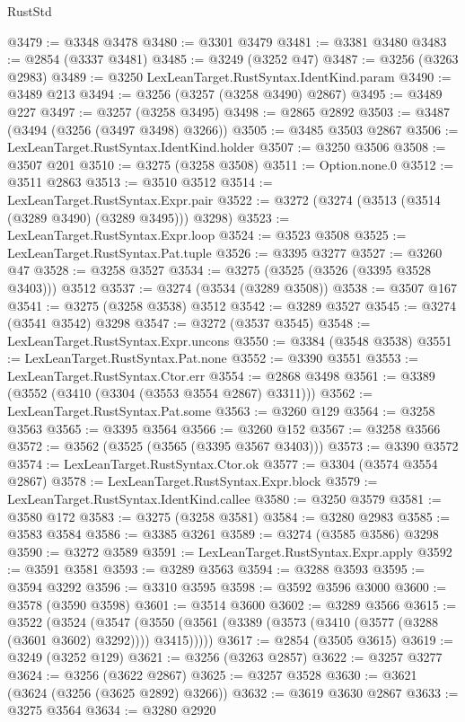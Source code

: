\begin{lexlean}{RustStd}
\begin{coremodule}
@3479 := @3348 @3478
@3480 := @3301 @3479
@3481 := @3381 @3480
@3483 := @2854 (@3337 @3481)
@3485 := @3249 (@3252 @47)
@3487 := @3256 (@3263 @2983)
@3489 := @3250 LexLeanTarget.RustSyntax.IdentKind.param
@3490 := @3489 @213
@3494 := @3256 (@3257 (@3258 @3490) @2867)
@3495 := @3489 @227
@3497 := @3257 (@3258 @3495)
@3498 := @2865 @2892
@3503 := @3487 (@3494 (@3256 (@3497 @3498) @3266))
@3505 := @3485 @3503 @2867
@3506 := LexLeanTarget.RustSyntax.IdentKind.holder
@3507 := @3250 @3506
@3508 := @3507 @201
@3510 := @3275 (@3258 @3508)
@3511 := Option.none.{0}
@3512 := @3511 @2863
@3513 := @3510 @3512
@3514 := LexLeanTarget.RustSyntax.Expr.pair
@3522 := @3272 (@3274 (@3513 (@3514 (@3289 @3490) (@3289 @3495))) @3298)
@3523 := LexLeanTarget.RustSyntax.Expr.loop
@3524 := @3523 @3508
@3525 := LexLeanTarget.RustSyntax.Pat.tuple
@3526 := @3395 @3277
@3527 := @3260 @47
@3528 := @3258 @3527
@3534 := @3275 (@3525 (@3526 (@3395 @3528 @3403))) @3512
@3537 := @3274 (@3534 (@3289 @3508))
@3538 := @3507 @167
@3541 := @3275 (@3258 @3538) @3512
@3542 := @3289 @3527
@3545 := @3274 (@3541 @3542) @3298
@3547 := @3272 (@3537 @3545)
@3548 := LexLeanTarget.RustSyntax.Expr.uncons
@3550 := @3384 (@3548 @3538)
@3551 := LexLeanTarget.RustSyntax.Pat.none
@3552 := @3390 @3551
@3553 := LexLeanTarget.RustSyntax.Ctor.err
@3554 := @2868 @3498
@3561 := @3389 (@3552 (@3410 (@3304 (@3553 @3554 @2867) @3311)))
@3562 := LexLeanTarget.RustSyntax.Pat.some
@3563 := @3260 @129
@3564 := @3258 @3563
@3565 := @3395 @3564
@3566 := @3260 @152
@3567 := @3258 @3566
@3572 := @3562 (@3525 (@3565 (@3395 @3567 @3403)))
@3573 := @3390 @3572
@3574 := LexLeanTarget.RustSyntax.Ctor.ok
@3577 := @3304 (@3574 @3554 @2867)
@3578 := LexLeanTarget.RustSyntax.Expr.block
@3579 := LexLeanTarget.RustSyntax.IdentKind.callee
@3580 := @3250 @3579
@3581 := @3580 @172
@3583 := @3275 (@3258 @3581)
@3584 := @3280 @2983
@3585 := @3583 @3584
@3586 := @3385 @3261
@3589 := @3274 (@3585 @3586) @3298
@3590 := @3272 @3589
@3591 := LexLeanTarget.RustSyntax.Expr.apply
@3592 := @3591 @3581
@3593 := @3289 @3563
@3594 := @3288 @3593
@3595 := @3594 @3292
@3596 := @3310 @3595
@3598 := @3592 @3596 @3000
@3600 := @3578 (@3590 @3598)
@3601 := @3514 @3600
@3602 := @3289 @3566
@3615 := @3522
    (@3524
      (@3547 (@3550 (@3561 (@3389 (@3573 (@3410 (@3577 (@3288 (@3601 @3602) @3292)))) @3415)))))
@3617 := @2854 (@3505 @3615)
@3619 := @3249 (@3252 @129)
@3621 := @3256 (@3263 @2857)
@3622 := @3257 @3277
@3624 := @3256 (@3622 @2867)
@3625 := @3257 @3528
@3630 := @3621 (@3624 (@3256 (@3625 @2892) @3266))
@3632 := @3619 @3630 @2867
@3633 := @3275 @3564
@3634 := @3280 @2920

\end{coremodule}
\end{lexlean}
